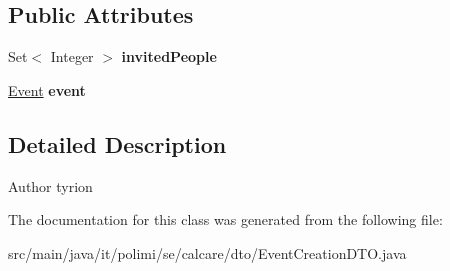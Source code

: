 \subsection*{Public Attributes}
\begin{DoxyCompactItemize}
\item 
\hypertarget{classit_1_1polimi_1_1se_1_1calcare_1_1dto_1_1EventCreationDTO_a50823f0fc4a3afa12df71e7cd91d869c}{}Set$<$ Integer $>$ {\bfseries invited\+People}\label{classit_1_1polimi_1_1se_1_1calcare_1_1dto_1_1EventCreationDTO_a50823f0fc4a3afa12df71e7cd91d869c}

\item 
\hypertarget{classit_1_1polimi_1_1se_1_1calcare_1_1dto_1_1EventCreationDTO_a1e255633cbfbde8acae6c22a11bb4eea}{}\hyperlink{classit_1_1polimi_1_1se_1_1calcare_1_1entities_1_1Event}{Event} {\bfseries event}\label{classit_1_1polimi_1_1se_1_1calcare_1_1dto_1_1EventCreationDTO_a1e255633cbfbde8acae6c22a11bb4eea}

\end{DoxyCompactItemize}


\subsection{Detailed Description}
\begin{DoxyAuthor}{Author}
tyrion 
\end{DoxyAuthor}


The documentation for this class was generated from the following file\+:\begin{DoxyCompactItemize}
\item 
src/main/java/it/polimi/se/calcare/dto/Event\+Creation\+D\+T\+O.\+java\end{DoxyCompactItemize}
